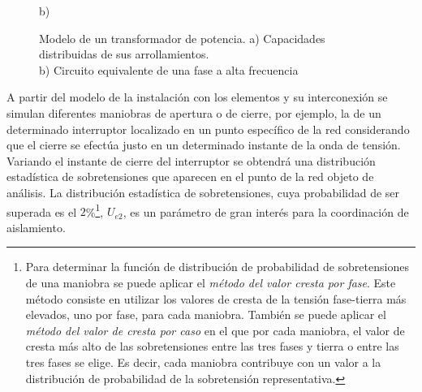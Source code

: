 \begin{figure}[H]
\begin{minipage}{0.7\textwidth}
                \end{minipage}%
                \begin{minipage}{0.3\textwidth}
                    \centering
                    b)
                    
                    \vspace{0.25cm}
                \end{minipage}
                \caption{Modelo de un transformador de potencia. a) Capacidades distribuidas de sus
                arrollamientos.\\b) Circuito equivalente de una fase a alta frecuencia}
                \label{fig:modelosTransitorios}
            \end{figure}

            A partir del modelo de la instalación con los elementos y su interconexión se simulan diferentes maniobras de apertura o de cierre, por ejemplo, la de un determinado interruptor localizado en un punto específico de la red considerando que el cierre se efectúa justo en un determinado instante de la onda de tensión. Variando el instante de cierre del interruptor se obtendrá una distribución estadística de sobretensiones que aparecen en el punto de la red objeto de análisis. La distribución estadística de sobretensiones, cuya probabilidad de ser superada es el $2\!$\%\footnote{Para determinar la función de distribución de probabilidad de sobretensiones de una maniobra se puede aplicar el \textit{método del valor cresta por fase}. Este método consiste en utilizar los valores de cresta de la tensión fase-tierra más elevados, uno por fase, para cada maniobra. También se puede aplicar el \textit{método del valor de cresta por caso} en el que por cada maniobra, el valor de cresta más alto de las sobretensiones entre las tres fases y tierra o entre las tres fases se elige. Es decir, cada maniobra contribuye con un valor a la distribución de probabilidad de la sobretensión representativa.}, $U_{\textit{e}2}$, es un parámetro de gran interés para la coordinación de aislamiento.\newpage

